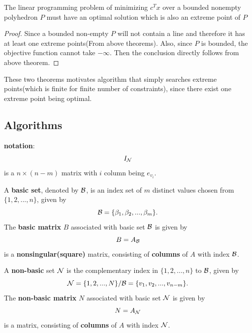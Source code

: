 \begin{refsection}
\begin{theorem}
	The linear programming problem of minimizing $c^Tx$ over a bounded nonempty polyhedron $P$ must have an optimal solution which is also an extreme point of $P$
\end{theorem}
\begin{proof}
	Since a bounded non-empty $P$ will not contain a line and therefore it has at least one extreme points(From above theorems). Also, since $P$ is bounded, the objective function cannot take $-\infty$. Then the conclusion directly follows from above theorem.
\end{proof}

\begin{remark}[Implications]
	These two theorems motivates algorithm that simply searches extreme points(which is finite for finite number of constraints), since there exist one extreme point being optimal.
\end{remark}




\subsection{Algorithms}
\begin{mdframed}
\textbf{notation}:\\
$$I_{\mathcal{N}}$$
is a $n\times (n-m)$ matrix with $i$ column being $e_{v_i}$.
\end{mdframed}

\begin{definition}
A \textbf{basic set}, denoted by $\mathcal{B}$, is an index set of $m$ distinct values chosen from $\{1,2,...,n\}$, given by
$$\mathcal{B}=\{\beta_1,\beta_2,...,\beta_m\}.$$
The \textbf{basic matrix} $B$ associated with basic set $\mathcal{B}$ is given by
$$B = A_{\mathcal{B}}$$
is a \textbf{nonsingular(square)} matrix, consisting of \textbf{columns} of $A$ with index $\mathcal{B}$.  
\end{definition}

\begin{definition}
A \textbf{non-basic} set $\mathcal{N}$ is the complementary index in $\{1,2,...,n\}$ to $\mathcal{B}$, given by
$$\mathcal{N} = \{1,2,...,N\} / \mathcal{B} = \{v_1,v_2,...,v_{n-m}\}.$$
The \textbf{non-basic matrix} $N$ associated with basic set $\mathcal{N}$ is given by
$$N = A_{\mathcal{N}}$$
is a matrix, consisting of \textbf{columns} of $A$ with index $\mathcal{N}$.
\end{definition}



\end{refsection}
